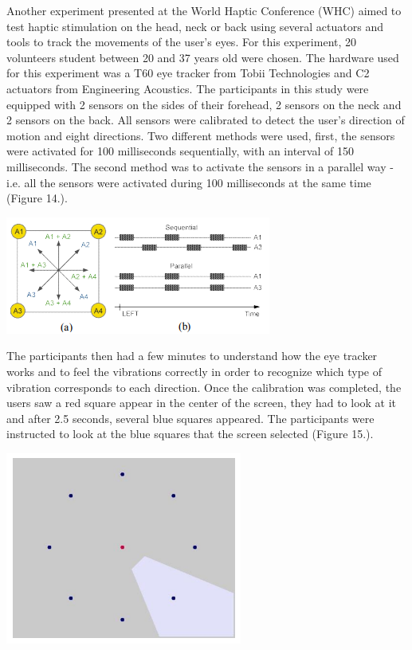 \documentclass[12pt, a4paper]{article}
\begin{document}
\begin{multicols}{2}
\vspace*{3mm}

Another experiment presented at the World Haptic Conference (WHC) aimed to test haptic stimulation on the head, neck or back using several actuators and tools to track the movements of the user's eyes. For this experiment, 20 volunteers student between 20 and 37 years old were chosen. The hardware used for this experiment was a T60 eye tracker from Tobii Technologies and C2 actuators from Engineering Acoustics\cite{whc}.
The participants in this study were equipped with 2 sensors on the sides of their forehead, 2 sensors on the neck and 2 sensors on the back. All sensors were calibrated to detect the user's direction of motion and eight directions. Two different methods were used, first, the sensors were activated for 100 milliseconds sequentially, with an interval of 150 milliseconds. The second method was to activate the sensors in a parallel way - i.e. all the sensors were activated during 100 milliseconds at the same time\cite{whc} (Figure 14.).

\vspace*{3mm}
\captionsetup{type=figure}
\includegraphics[width=.49\textwidth]{StimulationModel.png}
\vspace*{3mm}

The participants then had a few minutes to understand how the eye tracker works and to feel the vibrations correctly in order to recognize which type of vibration corresponds to each direction. Once the calibration was completed, the users saw a red square appear in the center of the screen, they had to look at it and after 2.5 seconds, several blue squares appeared. The participants were instructed to look at the blue squares that the screen selected\cite{whc} (Figure 15.).

\vspace*{3mm}
\captionsetup{type=figure}
\includegraphics[width=.49\textwidth]{ExperimentalSetup.png}
\vspace*{3mm}


\end{multicols}
\end{document}
